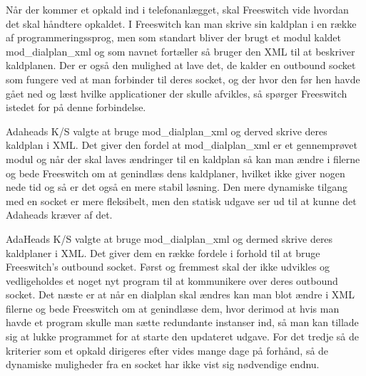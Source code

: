 Når der kommer et opkald ind i telefonanlægget, skal Freeswitch vide hvordan det skal håndtere opkaldet.
I Freeswitch kan man skrive sin kaldplan i en række af programmeringssprog, men som standart bliver der brugt et modul kaldet mod\_dialplan\_xml og som navnet fortæller så bruger den XML til at beskriver kaldplanen. Der er også den mulighed at lave det, de kalder en outbound socket som fungere ved at man forbinder til deres socket, og der hvor den før hen havde gået ned og læst hvilke applicationer der skulle afvikles, så spørger Freeswitch istedet for på denne forbindelse. 

Adaheads K/S valgte at bruge mod\_dialplan\_xml og derved skrive deres kaldplan i XML. Det giver den fordel at mod\_dialplan\_xml er et gennemprøvet modul og når der skal laves ændringer til en kaldplan så kan man ændre i filerne og bede Freeswitch om at genindlæs dens kaldplaner, hvilket ikke giver nogen nede tid og så er det også en mere stabil løsning. Den mere dynamiske tilgang med en socket er mere fleksibelt, men den statisk udgave ser ud til at kunne det Adaheads kræver af det.

AdaHeads K/S valgte at bruge mod\_dialplan\_xml og dermed skrive deres kaldplaner i XML. Det giver dem en række fordele i forhold til at bruge Freeswitch's outbound socket. 
Først og fremmest skal der ikke udvikles og vedligeholdes et noget nyt program til at kommunikere over deres outbound socket. 
Det næste er at når en dialplan skal ændres kan man blot ændre i XML filerne og bede Freeswitch om at genindlæse dem, hvor derimod at hvis man havde et program skulle man sætte redundante instanser ind, så man kan tillade sig at lukke programmet for at starte den updateret udgave. 
For det tredje så de kriterier som et opkald dirigeres efter vides mange dage på forhånd, så de dynamiske muligheder fra en socket har ikke vist sig nødvendige endnu.

\pagebreak
